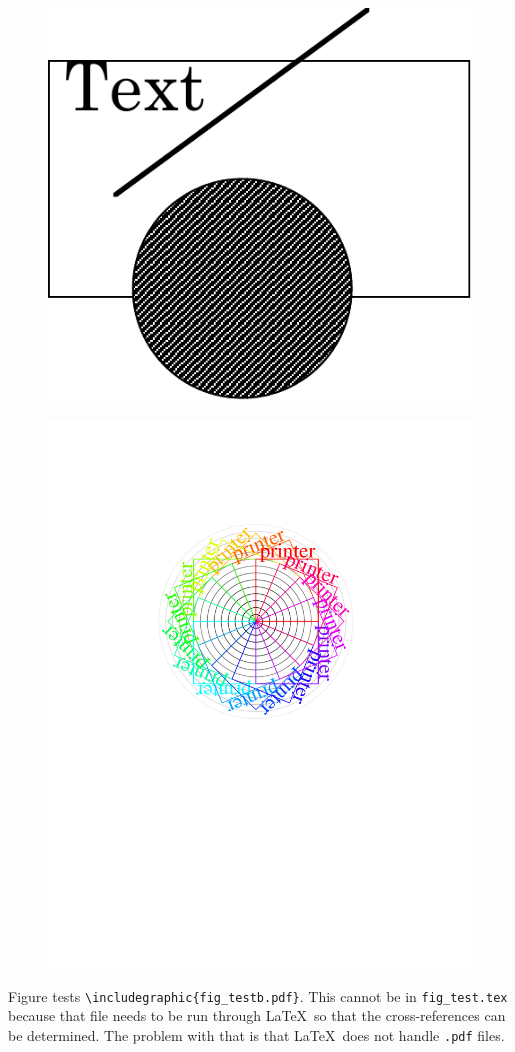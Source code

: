 \documentclass{article}
\begin{document}
\begin{figure}
\includegraphics{fig_testb.pdf}
\end{figure}

\begin{figure}
\includegraphics{fig_testc.pdf}
\end{figure}

Figure tests \verb#\includegraphic{fig_testb.pdf}#.  This cannot be in
\texttt{fig\_test.tex} because that file needs to be run through \LaTeX\
so that the cross-references can be determined.  The problem with
that is that \LaTeX\ does not handle \texttt{.pdf} files.  
\end{document}
